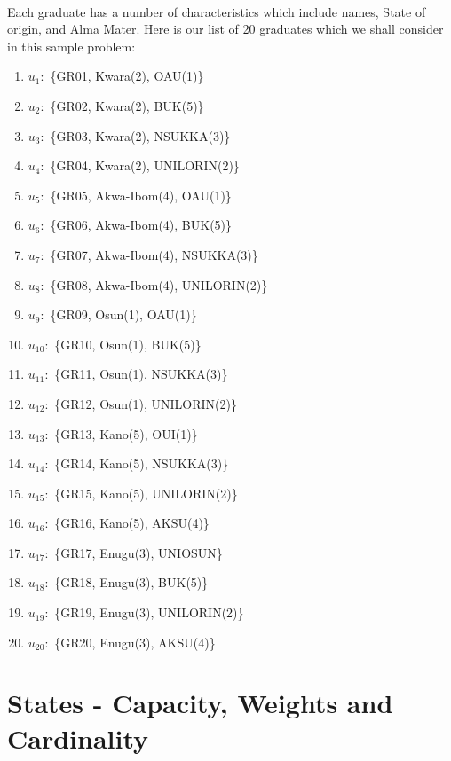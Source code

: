 \documentclass[a4paper]{book}
\begin{document}
			\paragraph{}
				Each graduate has a number of characteristics which include names, State of origin, and Alma Mater. Here is our list of 20 graduates which we shall consider in this sample problem:
				\begin{enumerate}
					\item $u_1\colon$ \{GR01, Kwara(2), OAU(1)\}
					\item $u_2\colon$ \{GR02, Kwara(2), BUK(5)\}
					\item $u_3\colon$ \{GR03, Kwara(2), NSUKKA(3)\}
					\item $u_4\colon$ \{GR04, Kwara(2), UNILORIN(2)\}
					\item $u_5\colon$ \{GR05, Akwa-Ibom(4), OAU(1)\}
					\item $u_6\colon$ \{GR06, Akwa-Ibom(4), BUK(5)\}
					\item $u_7\colon$ \{GR07, Akwa-Ibom(4), NSUKKA(3)\}
					\item $u_8\colon$ \{GR08, Akwa-Ibom(4), UNILORIN(2)\}
					\item $u_9\colon$ \{GR09, Osun(1), OAU(1)\}
					\item $u_{10}\colon$ \{GR10, Osun(1), BUK(5)\}
					\item $u_{11}\colon$ \{GR11, Osun(1), NSUKKA(3)\}
					\item $u_{12}\colon$ \{GR12, Osun(1), UNILORIN(2)\}
					\item $u_{13}\colon$ \{GR13, Kano(5), OUI(1)\}
					\item $u_{14}\colon$ \{GR14, Kano(5), NSUKKA(3)\}
					\item $u_{15}\colon$ \{GR15, Kano(5), UNILORIN(2)\}
					\item $u_{16}\colon$ \{GR16, Kano(5), AKSU(4)\}
					\item $u_{17}\colon$ \{GR17, Enugu(3), UNIOSUN\}
					\item $u_{18}\colon$ \{GR18, Enugu(3), BUK(5)\}
					\item $u_{19}\colon$ \{GR19, Enugu(3), UNILORIN(2)\}
					\item $u_{20}\colon$ \{GR20, Enugu(3), AKSU(4)\}
				\end{enumerate}
		\section{States - Capacity, Weights and Cardinality}
\end{document}
